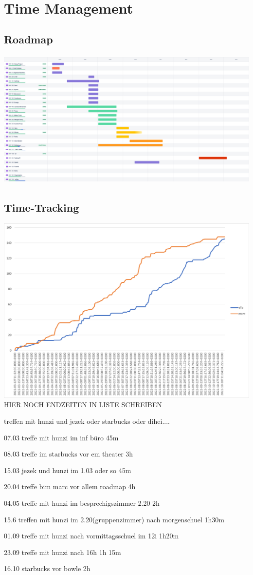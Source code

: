 \chapter{Time Management}

\section{Roadmap}
\includegraphics[height=7cm]{resources/Roadmap.png}\\

\section{Time-Tracking}
\includegraphics*[width=15cm]{resources/graph.png}\\


HIER NOCH ENDZEITEN IN LISTE SCHREIBEN


treffen mit hunzi und jezek oder starbucks oder dihei....

07.03 treffe mit hunzi im inf büro 45m

08.03 treffe im starbucks vor em theater 3h

15.03 jezek und hunzi im 1.03 oder so 45m

20.04 treffe bim marc vor allem roadmap 4h

04.05 treffe mit hunzi im besprechigszimmer 2.20 2h

15.6 treffen mit hunzi im 2.20(gruppenzimmer) nach morgenschuel 1h30m

01.09 treffe mit hunzi nach vormittagsschuel im 12i 1h20m

23.09 treffe mit hunzi nach 16h 1h 15m

16.10 starbucks vor bowle 2h

